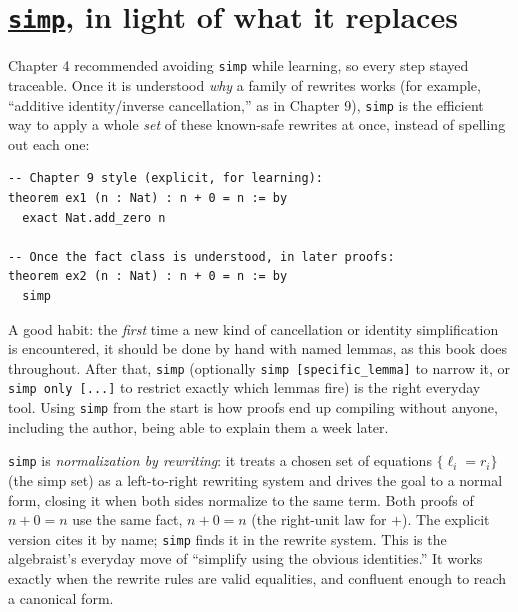 \section{\texorpdfstring{\href{https://lean-lang.org/doc/reference/latest/Tactic-Proofs/Tactic-Reference/}{\texttt{simp}}, in light of what it replaces}{simp, in light of what it replaces}}\label{sec:12-working-efficiently:03-simp:1}

Chapter 4 recommended avoiding \texttt{simp} while learning, so every step stayed traceable. Once it is understood \emph{why} a family of rewrites works (for example, ``additive identity/inverse cancellation,'' as in Chapter 9), \texttt{simp} is the efficient way to apply a whole \emph{set} of these known-safe rewrites at once, instead of spelling out each one:

\begin{lstlisting}
-- Chapter 9 style (explicit, for learning):
theorem ex1 (n : Nat) : n + 0 = n := by
  exact Nat.add_zero n

-- Once the fact class is understood, in later proofs:
theorem ex2 (n : Nat) : n + 0 = n := by
  simp
\end{lstlisting}

A good habit: the \emph{first} time a new kind of cancellation or identity simplification is encountered, it should be done by hand with named lemmas, as this book does throughout. After that, \texttt{simp} (optionally \texttt{simp [specific\_lemma]} to narrow it, or \texttt{simp only [...]} to restrict exactly which lemmas fire) is the right everyday tool. Using \texttt{simp} from the start is how proofs end up compiling without anyone, including the author, being able to explain them a week later.

\begin{mathreading}

\texttt{simp} is \emph{normalization by rewriting}: it treats a chosen set of equations \(\{\ell_i = r_i\}\) (the simp set) as a left-to-right rewriting system and drives the goal to a normal form, closing it when both sides normalize to the same term. Both proofs of \(n + 0 = n\) use the same fact, \(n + 0 = n\) (the right-unit law for \(+\)). The explicit version cites it by name; \texttt{simp} finds it in the rewrite system. This is the algebraist's everyday move of ``simplify using the obvious identities.'' It works exactly when the rewrite rules are valid equalities, and confluent enough to reach a canonical form.

\end{mathreading}
